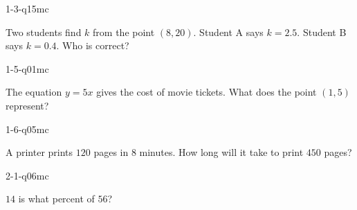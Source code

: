 
\begin{practiceQuestion}{1-3-q15}{mc}
\begin{questionText}
Two students find $k$ from the point $(8, 20)$. Student A says $k = 2.5$. Student B says $k = 0.4$. Who is correct?
\end{questionText}
\end{practiceQuestion}

\begin{practiceQuestion}{1-5-q01}{mc}
\begin{questionText}
The equation $y = 5x$ gives the cost of movie tickets. What does the point $(1, 5)$ represent?
\end{questionText}
\end{practiceQuestion}

\begin{practiceQuestion}{1-6-q05}{mc}
\begin{questionText}
A printer prints $120$ pages in $8$ minutes. How long will it take to print $450$ pages?
\end{questionText}
\end{practiceQuestion}

\begin{practiceQuestion}{2-1-q06}{mc}
\begin{questionText}
$14$ is what percent of $56$?
\end{questionText}
\end{practiceQuestion}

